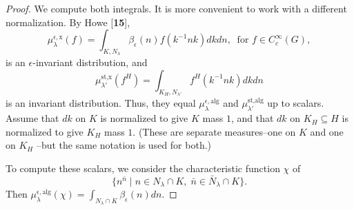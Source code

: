 \documentclass{amsart}
\begin{document}
\begin{proof}
We compute both integrals.
It is more convenient to work with a different normalization.
By Howe [{\bf 15}],
%
$$
  \mu_{\lambda}^{\epsilon,\text{x}}
  (f) =
  \int_{ K, N_{\lambda} }
  \beta_{\epsilon} (n) 
  f (k^{-1}nk) dkdn, \ \text{ for }
  f \in 
  C_c^{\infty} (G),
$$
%
is an $\epsilon$-invariant distribution, and
%
$$
  \mu_{\lambda'}^{\text{st,x}} (f^H) =
  \int_{K_H,N_{\lambda'}}
  f^H
  (k^{-1}nk)
  dkdn 
$$
%
is an invariant distribution.
Thus, they equal
  $ \mu_{\lambda}^{\epsilon, \text{alg}}$ and
    $\mu_{\lambda'}^{\text{st,alg}} $
up to scalars.
Assume that $dk$ on $K$ is normalized to give $K$ mass $1$, and
that $dk$ on
  $ K_H \subseteq H $
is normalized to give 
  $ K_H $
mass $1$.
(These are separate measures--one on $K$ and one on
  $ K_H $
--but the same notation is used for both.)

To compute these scalars, we consider the characteristic function $\chi$
 of 
%
$$
   \{
      n^{\bar n} \mid
      n \in N_{\lambda} \cap K, \;
      \bar n \in \bar N_{\lambda} \cap K 
    \}.
$$
%
Then 
  $ \mu_{\lambda}^{\epsilon,\text{alg}}
    (\chi) =
    \int_{ N_{\lambda}\cap K }
    \beta_{\epsilon} (n) d n $.


\end{proof}
\end{document}
